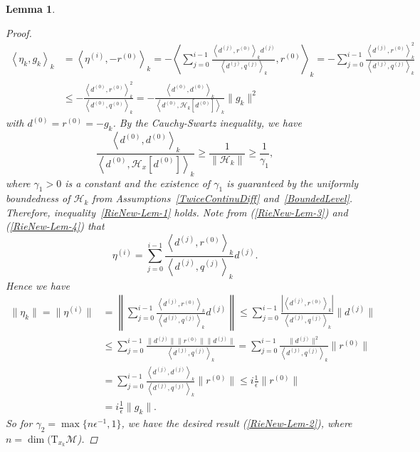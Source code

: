\documentclass[11pt]{article}
\newcommand{\zwhcomm}[2]{{\sf\color{purple} #1}{\sf\color{blue} #2}}
\newtheorem{lemma}{Lemma}[section]
\numberwithin{equation}{section}
\begin{document}
\begin{lemma}
\begin{proof}
\begin{equation}
  \begin{aligned} \nonumber
  \left<\eta_k,g_k\right>_k &= \left<\eta^{(i)},-r^{(0)}\right>_k=-\left< \sum_{j=0}^{i-1} \frac{ \left<d^{(j)},r^{(0)}\right>_k d^{(j)}}{\left<d^{(j)},q^{(j)}\right>_k},r^{(0)} \right>_k = -\sum_{j=0}^{i-1}\frac{\left<d^{(j)},r^{(0)}\right>_k^2}{\left<d^{(j)},q^{(j)}\right>_k} \\ & \le - \frac{\left<d^{(0)},r^{(0)}\right>_k^2}{\left<d^{(0)},q^{(0)}\right>_k}=- \frac{\left<d^{(0)},d^{(0)}\right>_k}{\left<d^{(0)},\mathcal{H}_k[d^{(0)}]\right>_k}\|g_k\|^2
  \end{aligned}
\end{equation}
with $d^{(0)}=r^{(0)}=-g_k$. By the Cauchy-Swartz inequality, we have 
\[
  \frac{ \left< d^{(0)},d^{(0)} \right>_k }{\left<d^{(0)},\mathcal{H}_x[d^{(0)}] \right>_k}\ge \frac{1}{{\|\mathcal{H}_k}\|} \ge\frac{1}{\gamma_1}, 
\] 
where $\gamma_1>0$ is a constant and the existence of $\gamma_1$ is guaranteed by the uniformly boundedness of $\mathcal{H}_k$ from Assumptions~\ref{TwiceContinuDiff} and~\ref{BoundedLevel}. Therefore, inequality~\eqref{RieNew-Lem-1} holds.
Note from (\ref{RieNew-Lem-3}) and (\ref{RieNew-Lem-4}) that 
\[
  \eta^{(i)} = \sum_{j=0}^{i-1}\frac{\left<d^{(j)},r^{(0)}\right>_k}{\left<d^{(j)},q^{(j)}\right>_k}d^{(j)}.
  \]
Hence we have 
\begin{equation}
  \begin{aligned} \nonumber
    \|\eta_k\| = \|\eta^{(i)}\| &= \left\|  \sum_{j=0}^{i-1}\frac{\left<d^{(j)},r^{(0)}\right>_k}{\left<d^{(j)},q^{(j)}\right>_k}d^{(j)} \right\| \le \sum_{j=0}^{i-1} \frac{|\left< d^{(j)},r^{(0)} \right>_k|}{\left<d^{(j)},q^{(j)}\right>_k} \|d^{(j)}\| \\ 
    & \le \sum_{j=0}^{i-1} \frac{ \|d^{(j)}\|\|r^{(0)}\|\|d^{(j)}\| }{\left<d^{(j)},q^{(j)}\right>_k} = \sum_{j=0}^{i-1}\frac{\|d^{(j)}\|^2}{\left<d^{(j)},q^{(j)}\right>_k}\|r^{(0)}\| \\ 
    &= \sum_{j=0}^{i-1} \frac{\left<d^{(j)},d^{(j)}\right>_k}{\left<d^{(j)},q^{(j)}\right>_k}\|r^{(0)}\| \le i \frac{1}{\epsilon} \|r^{(0)}\| \\ 
    &= i \frac{1}{\epsilon} \|g_k\|.
  \end{aligned}
\end{equation}
So for $\gamma_2=\max\{n \epsilon^{-1},1\}$, we have the desired result (\ref{RieNew-Lem-2}), where $n=\dim(\mathrm{T}_{x_k}\mathcal{M}$). 
\end{proof}
\end{lemma}
\end{document}
